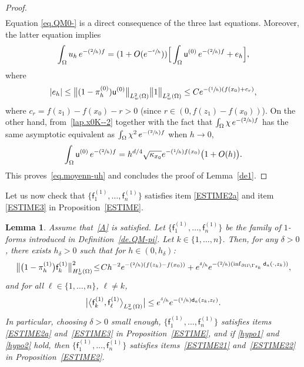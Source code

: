 \documentclass[JEP,XML,SOM,Unicode,NoEqCountersInSection,NoFloatCountersInSection,published]{cedram}
\newcommand{\Psfrac}[2]{(\sfrac{#1}{#2})}
\let\lp\langle
\let\rp\rangle
\theoremstyle{plain}
\newtheorem{lemma}[proposition]{Lemma}
\theoremstyle{definition}
\begin{document}
\begin{proof}
\begin{align*}
\end{align*}
Equation \eqref{eq.QM0-} is a direct consequence of the three last equations.
Moreover, the latter equation implies\vspace*{-3pt}
\[
\int_\Omega u_h\, e^{-\Psfrac 2h f}= (1+O(e^{-\sfrac ch})) \Big[\int_\Omega \mathsf u^{(0)} \, e^{-\Psfrac 2h f}+ e_h\Big],
\]
where\vspace*{-3pt}
\[
\vert e_h\vert \le \big \Vert(1- \pi_h^{(0)}) \mathsf u^{(0)} \big \Vert_{L^2_w(\Omega)}\big \Vert1\big \Vert_{L^2_w(\Omega)}\le C e^{-\Psfrac{1}{h} (f(x_0) +c_r)},
\]
where $c_r=f(z_1)-f(x_0)-r>0$ (since $r\in (0,f(z_1)-f(x_0))$). On the other hand, from~\eqref{lap.x0K--2} together with the fact that $\int_\Omega \chi \, e^{-\Psfrac 2h f}$ has the same asymptotic equivalent as $\int_\Omega \chi^2 \, e^{-\Psfrac 2h f}$ when $h\to 0$,\vspace*{-3pt}
\[
\int_\Omega \mathsf u^{(0)} \, e^{-\Psfrac 2h f}=h^{d/4}\sqrt{\kappa_{x_0}}e^{-\Psfrac 1h f(x_0)} \bigl(1+O(h)\bigr).
\]
This proves~\eqref{eq.moyenn-uh}
and concludes the proof of Lemma~\ref{de1}.
\end{proof}

Let us now check that $\{\mathsf f_1^{(1)}, \ldots, \mathsf f_n^{(1)}\} $ satisfies item \eqref{ESTIME2a} and item \eqref{ESTIME3} in Proposition~\ref{ESTIME}.
\begin{lemma}\label{de2}
Assume that~\ref{A} is satisfied. Let $\{\mathsf f_1^{(1)}, \ldots, \mathsf f_n^{(1)}\} $ be the family of $1$\nobreakdash-forms introduced in Definition~\ref{de.QM-pi}. Let $k\in \{1,\ldots,n\}$. Then,
for any $\delta>0$,
there exists $h_\delta>0$ such that for $h\in (0,h_\delta)$:\vspace*{-3pt}
\begin{equation}\label{eq.estimePrecise-co1}
\big \| \bigl(1-\pi_h^{(1)}\bigr) \mathsf f_k^{(1)} \big \|_{H^1_{w}(\Omega)}^2 \!\le\! C h^{-2}e^{-\Psfrac 2h(f(z_k)-f(x_0))}+ e^{\sfrac{ \delta }{h}} e^{-\Psfrac 2h(\inf_{ \partial \Omega \setminus \Gamma_{z_k}} \mathsf d_a(\cdot,z_k))},
\end{equation}
and for all $\ell \in \{1,\ldots,n\}$, $\ell \neq k$,
\begin{equation}\label{eq.estimePrecise-co2}
\big\vert \big\lp\mathsf f_k^{(1)}, \mathsf f_\ell^{(1)}\big\rp_{L^2_w(\Omega)}\big\vert \le e^{\sfrac{\delta}{ h}} e^{-\Psfrac 1h \mathsf d_a(z_k,z_\ell)}.
\end{equation}
In particular, choosing $\delta>0$ small enough, $\{\mathsf f_1^{(1)}, \ldots, \mathsf f_n^{(1)}\} $ satisfies items \eqref{ESTIME2a} and~\eqref{ESTIME3} in Proposition~\ref{ESTIME}, and if \eqref{hypo1} and \eqref{hypo2} hold, then $\{\mathsf f_1^{(1)}, \ldots, \mathsf f_n^{(1)}\} $ satisfies items~\eqref{ESTIME21} and~\eqref{ESTIME22} in Proposition~\ref{ESTIME2}.
\end{lemma}
\end{document}
